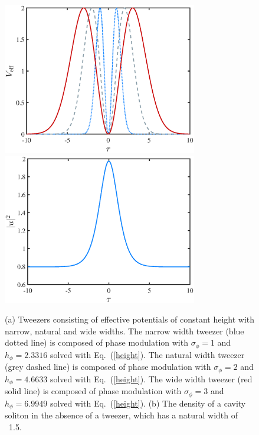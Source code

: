 \documentclass[aps,floatfix,showpacs,preprintnumbers,twocolumn,nofootinbib]{revtex4}
\begin{document}
\begin{figure}[t!]
\centering
\includegraphics[width=8.5cm]{potentials.eps}\\
\includegraphics[width=8.5cm]{noTrapCS.eps} 
\caption[Tweezers of Narrow, Natural, and Wide Widths]{(a) Tweezers consisting of effective potentials of constant height with narrow, natural and wide widths.  The narrow width tweezer (blue dotted line) is composed of phase modulation with $\sigma_\phi = 1$ and $h_\phi = 2.3316$ solved with Eq.~(\ref{height}).  The natural width tweezer (grey dashed line) is composed of phase modulation with $\sigma_\phi = 2$ and $h_\phi = 4.6633$ solved with Eq.~(\ref{height}).  The wide width tweezer (red solid line) is composed of phase modulation with $\sigma_\phi = 3$ and $h_\phi = 6.9949$ solved with Eq.~(\ref{height}). (b) The density of a cavity soliton in the absence of a tweezer, which has a natural width of ~1.5.  
}
\label{fig:Veff}
\end{figure}
\end{document}
